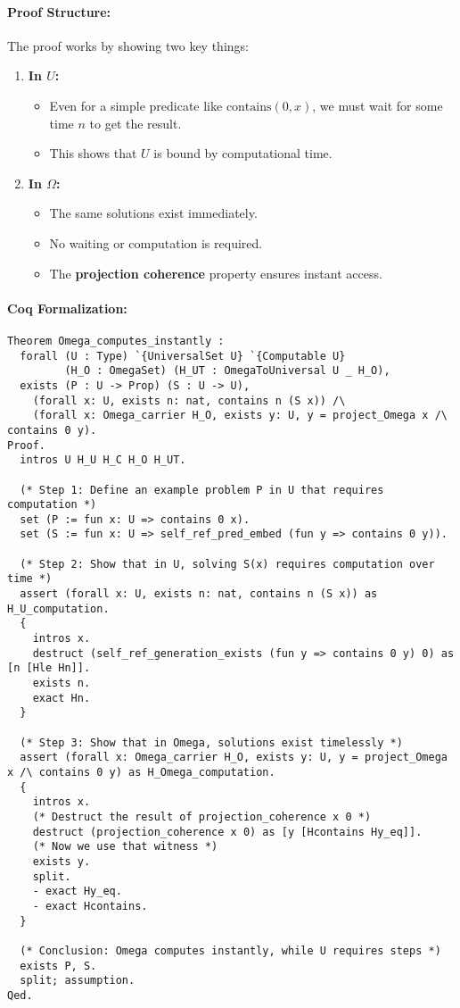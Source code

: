 \documentclass[12pt]{article}
\begin{document}
\paragraph{Proof Structure:}
The proof works by showing two key things:

\begin{enumerate}
    \item \textbf{In \( U \):}
    \begin{itemize}
        \item Even for a simple predicate like \( \text{contains}(0, x) \), we must wait for some time \( n \) to get the result.
        \item This shows that \( U \) is bound by computational time.
    \end{itemize}
    \item \textbf{In \( \Omega \):}
    \begin{itemize}
        \item The same solutions exist immediately.
        \item No waiting or computation is required.
        \item The \textbf{projection coherence} property ensures instant access.
    \end{itemize}
\end{enumerate}

\paragraph{Coq Formalization:}
\begin{lstlisting}[language=Coq]
Theorem Omega_computes_instantly :
  forall (U : Type) `{UniversalSet U} `{Computable U}
         (H_O : OmegaSet) (H_UT : OmegaToUniversal U _ H_O),
  exists (P : U -> Prop) (S : U -> U),
    (forall x: U, exists n: nat, contains n (S x)) /\
    (forall x: Omega_carrier H_O, exists y: U, y = project_Omega x /\ contains 0 y).
Proof.
  intros U H_U H_C H_O H_UT.
  
  (* Step 1: Define an example problem P in U that requires computation *)
  set (P := fun x: U => contains 0 x).
  set (S := fun x: U => self_ref_pred_embed (fun y => contains 0 y)).

  (* Step 2: Show that in U, solving S(x) requires computation over time *)
  assert (forall x: U, exists n: nat, contains n (S x)) as H_U_computation.
  { 
    intros x.
    destruct (self_ref_generation_exists (fun y => contains 0 y) 0) as [n [Hle Hn]].
    exists n.
    exact Hn.
  }

  (* Step 3: Show that in Omega, solutions exist timelessly *)
  assert (forall x: Omega_carrier H_O, exists y: U, y = project_Omega x /\ contains 0 y) as H_Omega_computation.
  { 
    intros x.
    (* Destruct the result of projection_coherence x 0 *)
    destruct (projection_coherence x 0) as [y [Hcontains Hy_eq]].
    (* Now we use that witness *)
    exists y.
    split.
    - exact Hy_eq.
    - exact Hcontains.
  }

  (* Conclusion: Omega computes instantly, while U requires steps *)
  exists P, S.
  split; assumption.
Qed.
\end{lstlisting}
\end{document}
